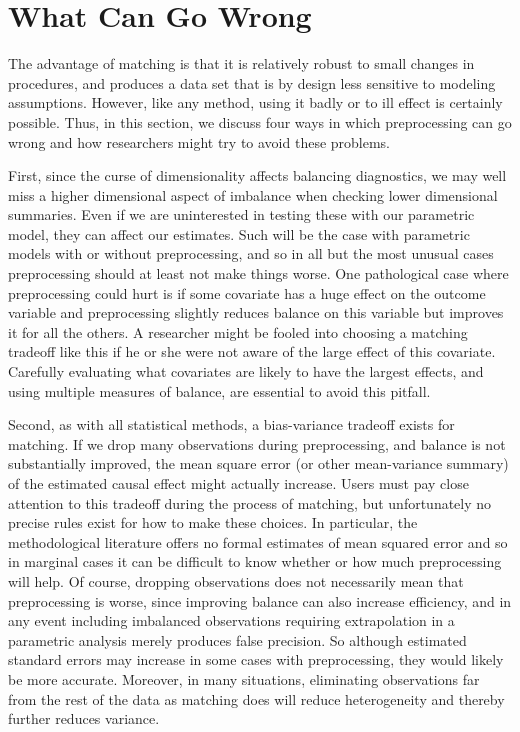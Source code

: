 \documentclass[11pt,titlepage]{article}
\begin{document}
\section{What Can Go Wrong}

The advantage of matching is that it is relatively robust to small
changes in procedures, and produces a data set that is by design less
sensitive to modeling assumptions.  However, like any method, using it
badly or to ill effect is certainly possible.  Thus, in this section,
we discuss four ways in which preprocessing can go wrong and how
researchers might try to avoid these problems.

First, since the curse of dimensionality affects balancing
diagnostics, we may well miss a higher dimensional aspect of imbalance
when checking lower dimensional summaries.  Even if we are
uninterested in testing these with our parametric model, they can
affect our estimates.  Such will be the case with parametric models
with or without preprocessing, and so in all but the most unusual
cases preprocessing should at least not make things worse.  One
pathological case where preprocessing could hurt is if some covariate
has a huge effect on the outcome variable and preprocessing slightly
reduces balance on this variable but improves it for all the others.
A researcher might be fooled into choosing a matching tradeoff like
this if he or she were not aware of the large effect of this
covariate.  Carefully evaluating what covariates are likely to have
the largest effects, and using multiple measures of balance, are
essential to avoid this pitfall.

Second, as with all statistical methods, a bias-variance tradeoff
exists for matching.  If we drop many observations during
preprocessing, and balance is not substantially improved, the mean
square error (or other mean-variance summary) of the estimated causal
effect might actually increase.  Users must pay close attention to
this tradeoff during the process of matching, but unfortunately no
precise rules exist for how to make these choices.  In particular, the
methodological literature offers no formal estimates of mean squared
error and so in marginal cases it can be difficult to know whether or
how much preprocessing will help.  Of course, dropping observations
does not necessarily mean that preprocessing is worse, since improving
balance can also increase efficiency, and in any event including
imbalanced observations requiring extrapolation in a parametric
analysis merely produces false precision.  So although estimated
standard errors may increase in some cases with preprocessing, they
would likely be more accurate.  Moreover, in many situations,
eliminating observations far from the rest of the data as matching
does will reduce heterogeneity and thereby further reduces 
variance.
\end{document}
